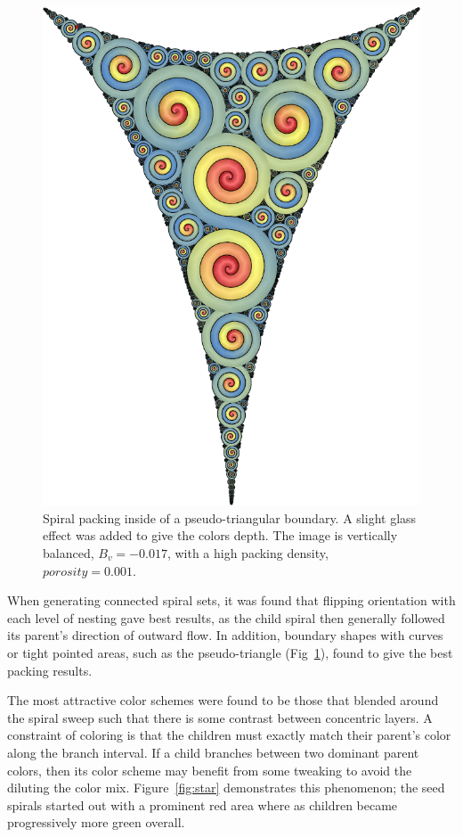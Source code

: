 \documentclass[11pt]{IEEEtran}
\begin{document}
\begin{figure}[h]
\centering \includegraphics[width=0.75\linewidth]{pseudo-triangle}
\caption{Spiral packing inside of a pseudo-triangular boundary. A slight glass effect was added to give the colors depth. The image is vertically balanced, $B_{v} = -0.017$, with a high packing density, $porosity = 0.001$.}
\label{fig:pseudotri}
\end{figure}

When generating connected spiral sets, it was found that flipping orientation with each level of nesting gave best results, as the child spiral then generally followed its parent's direction of outward flow. In addition, boundary shapes with curves or tight pointed areas, such as the pseudo-triangle (Fig~\ref{fig:pseudotri}), found to give the best packing results.

The most attractive color schemes were found to be those that blended  around the spiral sweep such that there is some contrast between concentric layers. A constraint of coloring is that the children must exactly match their parent's color along the branch interval. If a child branches between two dominant parent colors, then its color scheme may benefit from some tweaking to avoid the diluting the color mix. Figure~\ref{fig:star} demonstrates this phenomenon; the seed spirals started out with a prominent red area where as children became progressively more green overall.
\end{document}
